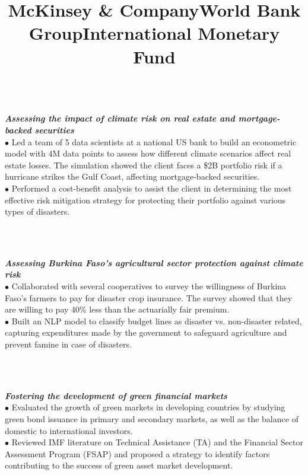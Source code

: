 \documentclass[overlapped]{res}
\begin{document}
\begin{resume}
\title{\textbf{McKinsey \& Company}}
\begin{position}\\[- 2 mm]
\textbf{\textit{Assessing the impact of climate risk on real estate and mortgage-backed securities}}\\
$\bullet$ Led a team of 5 data scientists at a national US bank to build an econometric model with 4M data points to assess how different climate scenarios affect real estate losses. The simulation showed the client faces a \$2B portfolio risk if a hurricane strikes the Gulf Coast, affecting mortgage-backed securities.\\
$\bullet$ Performed a cost-benefit analysis to assist the client in determining the most effective risk mitigation strategy for protecting their portfolio against various types of disasters.\\
\end{position}\\[-8.5 mm]
\title{\textbf{World Bank Group}}
\begin{position}\\[-2 mm]
\textbf{\textit{Assessing Burkina Faso's agricultural sector protection against climate risk}}\\
$\bullet$  Collaborated with several cooperatives to survey the willingness of Burkina Faso's farmers to pay for disaster crop insurance. The survey showed that they are willing to pay 40\% less than the actuarially fair premium.\\
$\bullet$ Built an NLP model to classify budget lines as disaster vs. non-disaster related, capturing expenditures made by the government to safeguard agriculture and prevent famine in case of disasters.\\
\end{position}\\[-8.5 mm]

\title{\textbf{International Monetary Fund}}
\begin{position}\\[- 2 mm]
\textbf{\textit{Fostering the development of green financial markets}}\\
$\bullet$ Evaluated the growth of green markets in developing countries by studying green bond issuance in primary and secondary markets, as well as the balance of domestic to international investors.\\
$\bullet$ Reviewed IMF literature on Technical Assistance (TA) and the Financial Sector Assessment Program (FSAP) and proposed a strategy to identify factors contributing to the success of green asset market development.\\


\end{position}
\end{resume}
\end{document}
